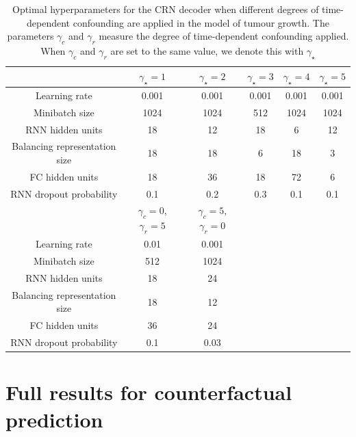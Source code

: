 \documentclass{article} %
\begin{document}
	\begin{table}[t]
	\caption{Optimal hyperparameters for the CRN decoder when different degrees of time-dependent confounding are applied in the model of tumour growth. The parameters $\gamma_c$ and $\gamma_r$ measure the degree of time-dependent confounding applied. When $\gamma_c$ and $\gamma_r$ are set to the same value, we denote this with $\gamma_{\star}$ }
	\label{tab:optimal_hyperparameters_CRN_decoder}
	\vskip -0.1in
	\begin{center}
	\begin{small}
		\begin{tabular}{cccccc}
			\toprule
			& $\gamma_{\star}=1$ & $\gamma_{\star}=2$ & $\gamma_{\star}=3$  & $\gamma_{\star}=4$ & $\gamma_{\star}=5$    \\
			\hline
			\hline
			Learning rate &    0.001  & 0.001 & 0.001 & 0.001 & 0.001   \\
			Minibatch size &  1024 & 1024 & 512 & 1024 & 1024 \\
			RNN hidden units & 18 & 12 & 18 & 6 & 12  \\
			Balancing representation size  & 18 & 18 & 6 & 18 & 3  \\
			FC hidden units & 18 & 36 & 18 & 72 & 6  \\
			RNN dropout probability &  0.1 & 0.2 & 0.3 & 0.1 & 0.1 \\
			\midrule 
			\midrule
			& $\gamma_c = 0$, $\gamma_r=5$ & $\gamma_c = 5$, $\gamma_r=0$  \\
			\hline
			\hline
			Learning rate  & 0.01 &0.001  \\
			Minibatch size & 512 & 1024 \\
			RNN hidden units &  18& 24 \\
			Balancing representation size  & 18 & 12 \\
			FC hidden units &36& 24 \\
			RNN dropout probability & 0.1& 0.03\\
			\bottomrule
		\end{tabular}
	\end{small}
	\end{center}
	\vskip -0.1in
	\end{table}

    \clearpage
    
    
	\section{Full results for counterfactual prediction} \label{apx:full_results_counterfactuals}
	
\end{document}
